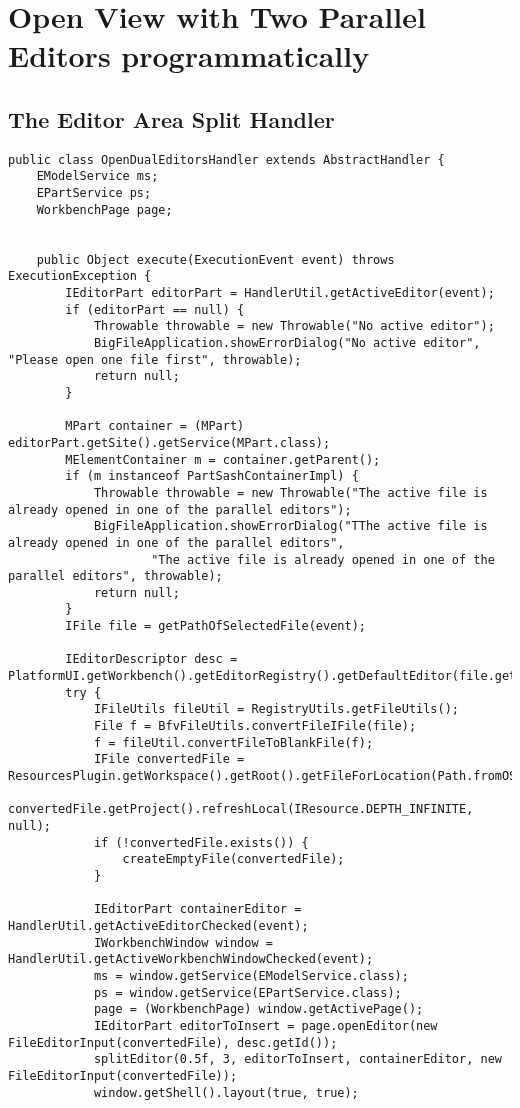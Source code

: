 \section{Open View with Two Parallel Editors programmatically}\label{paralleleditor}
\subsection{The Editor Area Split Handler}
\begin{lstlisting}
public class OpenDualEditorsHandler extends AbstractHandler {
	EModelService ms;
	EPartService ps;
	WorkbenchPage page;

	  
    public Object execute(ExecutionEvent event) throws ExecutionException {
		IEditorPart editorPart = HandlerUtil.getActiveEditor(event);
		if (editorPart == null) {
			Throwable throwable = new Throwable("No active editor");
			BigFileApplication.showErrorDialog("No active editor", "Please open one file first", throwable);
			return null;
		}

		MPart container = (MPart) editorPart.getSite().getService(MPart.class);
		MElementContainer m = container.getParent();
		if (m instanceof PartSashContainerImpl) {
			Throwable throwable = new Throwable("The active file is already opened in one of the parallel editors");
			BigFileApplication.showErrorDialog("TThe active file is already opened in one of the parallel editors",
					"The active file is already opened in one of the parallel editors", throwable);
			return null;
		}
		IFile file = getPathOfSelectedFile(event);

		IEditorDescriptor desc = PlatformUI.getWorkbench().getEditorRegistry().getDefaultEditor(file.getName());
		try {
			IFileUtils fileUtil = RegistryUtils.getFileUtils();
			File f = BfvFileUtils.convertFileIFile(file);
			f = fileUtil.convertFileToBlankFile(f);
			IFile convertedFile = ResourcesPlugin.getWorkspace().getRoot().getFileForLocation(Path.fromOSString(f.getAbsolutePath()));
			convertedFile.getProject().refreshLocal(IResource.DEPTH_INFINITE, null);
			if (!convertedFile.exists()) {
				createEmptyFile(convertedFile);
			}

			IEditorPart containerEditor = HandlerUtil.getActiveEditorChecked(event);
			IWorkbenchWindow window = HandlerUtil.getActiveWorkbenchWindowChecked(event);
			ms = window.getService(EModelService.class);
			ps = window.getService(EPartService.class);
			page = (WorkbenchPage) window.getActivePage();
			IEditorPart editorToInsert = page.openEditor(new FileEditorInput(convertedFile), desc.getId());
			splitEditor(0.5f, 3, editorToInsert, containerEditor, new FileEditorInput(convertedFile));
			window.getShell().layout(true, true);
			


\end{lstlisting}
